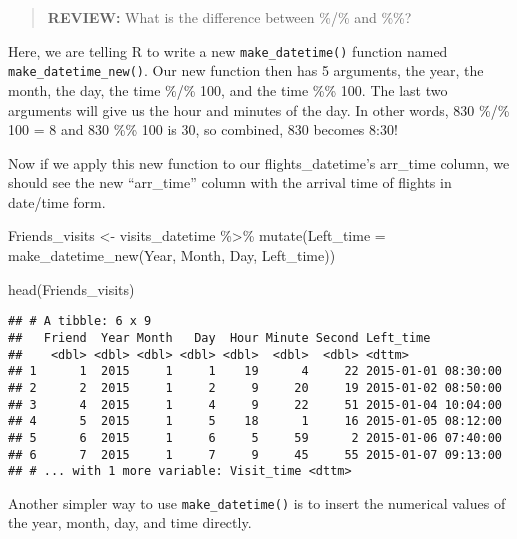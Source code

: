 \documentclass[
]{book}
\newenvironment{Shaded}{\begin{snugshade}}{\end{snugshade}}
\newcommand{\AttributeTok}[1]{\textcolor[rgb]{0.77,0.63,0.00}{#1}}
\newcommand{\FunctionTok}[1]{\textcolor[rgb]{0.00,0.00,0.00}{#1}}
\newcommand{\NormalTok}[1]{#1}
\newcommand{\OtherTok}[1]{\textcolor[rgb]{0.56,0.35,0.01}{#1}}
\newcommand{\SpecialCharTok}[1]{\textcolor[rgb]{0.00,0.00,0.00}{#1}}
\begin{document}
\begin{quote}
\textbf{REVIEW:} What is the difference between \%/\% and \%\%?
\end{quote}

Here, we are telling R to write a new \texttt{make\_datetime()} function named \texttt{make\_datetime\_new()}. Our new function then has 5 arguments, the year, the month, the day, the time \%/\% 100, and the time \%\% 100. The last two arguments will give us the hour and minutes of the day. In other words, 830 \%/\% 100 = 8 and 830 \%\% 100 is 30, so combined, 830 becomes 8:30!

Now if we apply this new function to our flights\_datetime's arr\_time column, we should see the new ``arr\_time'' column with the arrival time of flights in date/time form.

\begin{Shaded}
\begin{Highlighting}[]
\NormalTok{Friends\_visits }\OtherTok{\textless{}{-}}\NormalTok{ visits\_datetime }\SpecialCharTok{\%\textgreater{}\%}
    \FunctionTok{mutate}\NormalTok{(}\AttributeTok{Left\_time =} \FunctionTok{make\_datetime\_new}\NormalTok{(Year, Month, Day, Left\_time))}
\end{Highlighting}
\end{Shaded}

\begin{Shaded}
\begin{Highlighting}[]
\FunctionTok{head}\NormalTok{(Friends\_visits)}
\end{Highlighting}
\end{Shaded}

\begin{verbatim}
## # A tibble: 6 x 9
##   Friend  Year Month   Day  Hour Minute Second Left_time
##    <dbl> <dbl> <dbl> <dbl> <dbl>  <dbl>  <dbl> <dttm>
## 1      1  2015     1     1    19      4     22 2015-01-01 08:30:00
## 2      2  2015     1     2     9     20     19 2015-01-02 08:50:00
## 3      4  2015     1     4     9     22     51 2015-01-04 10:04:00
## 4      5  2015     1     5    18      1     16 2015-01-05 08:12:00
## 5      6  2015     1     6     5     59      2 2015-01-06 07:40:00
## 6      7  2015     1     7     9     45     55 2015-01-07 09:13:00
## # ... with 1 more variable: Visit_time <dttm>
\end{verbatim}

Another simpler way to use \texttt{make\_datetime()} is to insert the numerical values of the year, month, day, and time directly.
\end{document}
